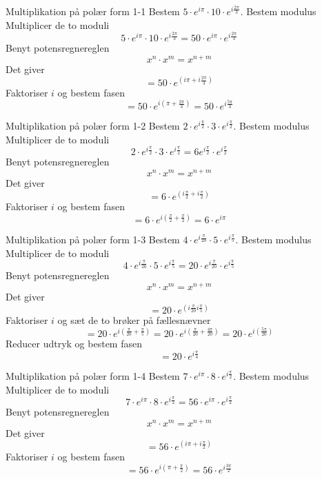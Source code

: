 \documentclass{article}
\begin{document}
\tableofcontents
\newpage
\begin{exercise}{Multiplikation på polær form 1-1}
Bestem $5 \cdot e^{i \pi} \cdot 10 \cdot e^{i \frac{2 \pi}{3}}$.
\hint
Bestem modulus
\hint
Multiplicer de to moduli
\[5 \cdot e^{i \pi} \cdot 10 \cdot e^{i \frac{2 \pi}{3}} = 50 \cdot e^{i \pi} \cdot e^{i \frac{2 \pi}{3}}
\]
\hint
Benyt potensregnereglen
\[x^n \cdot x^m = x^{n + m}
\]
\hint
Det giver
\[ = 50 \cdot e^{(i \pi + i \frac{2 \pi}{3})}
\]
\hint
Faktoriser $i$ og bestem fasen
\[ = 50 \cdot e^{i( \pi + \frac{2 \pi}{3})} = 50 \cdot e^{i \frac{5\pi}{3}}
\]
\end{exercise}
\newpage
\begin{exercise}{Multiplikation på polær form 1-2}
Bestem $2 \cdot e^{i \frac{\pi}{2}} \cdot 3 \cdot e^{i \frac{\pi}{2}}$.
\hint
Bestem modulus
\hint
Multiplicer de to moduli
\[2 \cdot e^{i \frac{\pi}{2}} \cdot 3 \cdot e^{i \frac{\pi}{2}} = 6 e^{i \frac{\pi}{2}} \cdot e^{i \frac{\pi}{2}}
\]
\hint
Benyt potensregnereglen
\[x^n \cdot x^m = x^{n + m}
\]
\hint
Det giver
\[ = 6 \cdot e^{(i \frac{\pi}{2} + i \frac{\pi}{2})}
\]
\hint
Faktoriser $i$ og bestem fasen
\[ = 6 \cdot e^{i( \frac{\pi}{2} + \frac{\pi}{2})} = 6 \cdot e^{i \pi}
\]
\end{exercise}
\newpage
\begin{exercise}{Multiplikation på polær form 1-3}
Bestem $4 \cdot e^{i \frac{\pi}{20}} \cdot 5 \cdot e^{i \frac{\pi}{5}}$.
\hint
Bestem modulus
\hint
Multiplicer de to moduli
\[4 \cdot e^{i \frac{\pi}{20}} \cdot 5 \cdot e^{i \frac{\pi}{5}} = 20 \cdot e^{i \frac{\pi}{20}} \cdot e^{i \frac{\pi}{5}}
\]
\hint
Benyt potensregnereglen
\[x^n \cdot x^m = x^{n + m}
\]
\hint
Det giver
\[ = 20 \cdot e^{(i \frac{\pi}{20}i \frac{\pi}{5})}
\]
\hint
Faktoriser $i$ og sæt de to brøker på fællesnævner
\[ = 20 \cdot e^{i( \frac{\pi}{20} + \frac{\pi}{5})} = 20 \cdot e^{i( \frac{\pi}{20} + \frac{4 \pi}{20})} = 20 \cdot e^{i( \frac{5\pi}{20})}
\]
\hint
Reducer udtryk og bestem fasen
\[ = 20 \cdot e^{i \frac{\pi}{4}}
\]
\end{exercise}
\newpage
\begin{exercise}{Multiplikation på polær form 1-4}
Bestem $7 \cdot e^{i \pi} \cdot 8 \cdot e^{i \frac{\pi}{2}}$.
\hint
Bestem modulus
\hint
Multiplicer de to moduli
\[7 \cdot e^{i \pi} \cdot 8 \cdot e^{i \frac{\pi}{2}} = 56 \cdot e^{i \pi} \cdot e^{i \frac{\pi}{2}}
\]
\hint
Benyt potensregnereglen
\[x^n \cdot x^m = x^{n + m}
\]
\hint
Det giver
\[ = 56 \cdot e^{(i \pi + i \frac{\pi}{2})}
\]
\hint
Faktoriser $i$ og bestem fasen
\[ = 56 \cdot e^{i( \pi + \frac{\pi}{2})} = 56 \cdot e^{i \frac{3\pi}{2}}
\]
\end{exercise}
\end{document}
